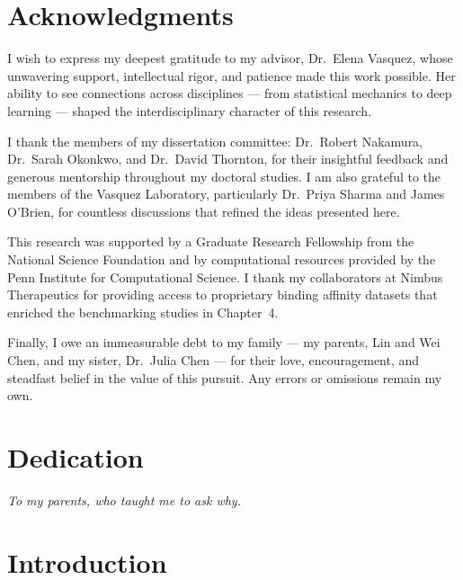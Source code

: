 \documentclass[12pt,oneside]{report}
\begin{document}
\chapter*{Acknowledgments}

I wish to express my deepest gratitude to my advisor, Dr.\ Elena Vasquez, whose unwavering support, intellectual rigor, and patience made this work possible. Her ability to see connections across disciplines --- from statistical mechanics to deep learning --- shaped the interdisciplinary character of this research.

I thank the members of my dissertation committee: Dr.\ Robert Nakamura, Dr.\ Sarah Okonkwo, and Dr.\ David Thornton, for their insightful feedback and generous mentorship throughout my doctoral studies. I am also grateful to the members of the Vasquez Laboratory, particularly Dr.\ Priya Sharma and James O'Brien, for countless discussions that refined the ideas presented here.

This research was supported by a Graduate Research Fellowship from the National Science Foundation and by computational resources provided by the Penn Institute for Computational Science. I thank my collaborators at Nimbus Therapeutics for providing access to proprietary binding affinity datasets that enriched the benchmarking studies in Chapter~4.

Finally, I owe an immeasurable debt to my family --- my parents, Lin and Wei Chen, and my sister, Dr.\ Julia Chen --- for their love, encouragement, and steadfast belief in the value of this pursuit. Any errors or omissions remain my own.

\chapter*{Dedication}
\begin{center}
\vspace*{3cm}
\textit{To my parents, who taught me to ask why.}
\end{center}

\tableofcontents
\newpage
\listoffigures
{}
\newpage
\listoftables
{}

\clearpage
{}

\chapter{Introduction}
\end{document}
